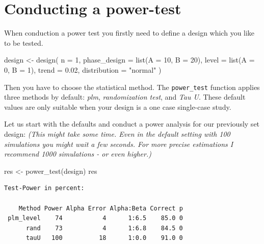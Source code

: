 \documentclass[
]{book}
\newenvironment{Shaded}{\begin{snugshade}}{\end{snugshade}}
\newcommand{\AttributeTok}[1]{\textcolor[rgb]{0.77,0.63,0.00}{#1}}
\newcommand{\DecValTok}[1]{\textcolor[rgb]{0.00,0.00,0.81}{#1}}
\newcommand{\FloatTok}[1]{\textcolor[rgb]{0.00,0.00,0.81}{#1}}
\newcommand{\FunctionTok}[1]{\textcolor[rgb]{0.00,0.00,0.00}{#1}}
\newcommand{\NormalTok}[1]{#1}
\newcommand{\OtherTok}[1]{\textcolor[rgb]{0.56,0.35,0.01}{#1}}
\newcommand{\StringTok}[1]{\textcolor[rgb]{0.31,0.60,0.02}{#1}}
\begin{document}
\hypertarget{conducting-a-power-test}{%
\section{Conducting a power-test}\label{conducting-a-power-test}}

When conduction a power test you firstly need to define a design which you like to be tested.

\begin{Shaded}
\begin{Highlighting}[]
\NormalTok{design }\OtherTok{\textless{}{-}} \FunctionTok{design}\NormalTok{(}
  \AttributeTok{n =} \DecValTok{1}\NormalTok{,}
  \AttributeTok{phase\_design =} \FunctionTok{list}\NormalTok{(}\AttributeTok{A =} \DecValTok{10}\NormalTok{, }\AttributeTok{B =} \DecValTok{20}\NormalTok{),}
  \AttributeTok{level =} \FunctionTok{list}\NormalTok{(}\AttributeTok{A =} \DecValTok{0}\NormalTok{, }\AttributeTok{B =} \DecValTok{1}\NormalTok{),}
  \AttributeTok{trend =} \FloatTok{0.02}\NormalTok{,}
  \AttributeTok{distribution =} \StringTok{"normal"}
\NormalTok{)}
\end{Highlighting}
\end{Shaded}

Then you have to choose the statistical method. The \texttt{power\_test} function applies three methods by default: \emph{plm}, \emph{randomization test}, and \emph{Tau U}.
These default values are only suitable when your design is a one case single-case study.

Let us start with the defaults and conduct a power analysis for our previously set design: \emph{(This might take some time. Even in the default setting with 100 simulations you might wait a few seconds. For more precise estimations I recommend 1000 simulations - or even higher.)}

\begin{Shaded}
\begin{Highlighting}[]
\NormalTok{res }\OtherTok{\textless{}{-}} \FunctionTok{power\_test}\NormalTok{(design)}
\NormalTok{res}
\end{Highlighting}
\end{Shaded}

\begin{verbatim}
Test-Power in percent:

    Method Power Alpha Error Alpha:Beta Correct p
 plm_level    74           4      1:6.5    85.0 0
      rand    73           4      1:6.8    84.5 0
      tauU   100          18      1:0.0    91.0 0
\end{verbatim}
\end{document}
